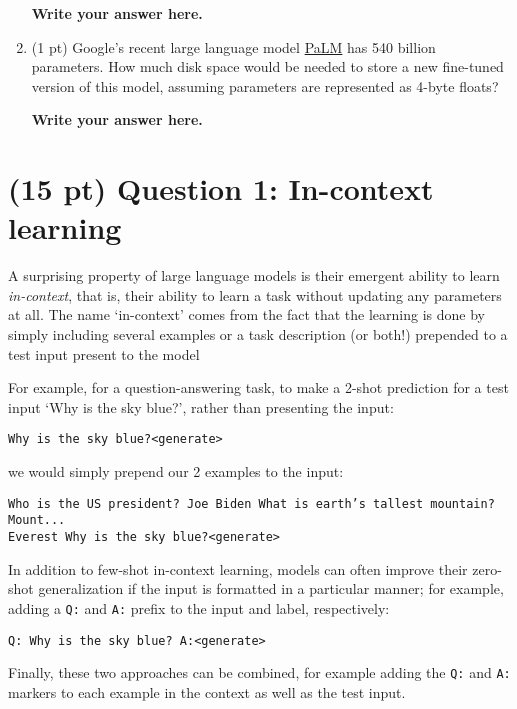 \documentclass[12pt]{article}
\begin{document}
\begin{enumerate}
    \textbf{\color{red} Write your answer here.}

    \item (1 pt) Google's recent large language model \href{https://storage.googleapis.com/pathways-language-model/PaLM-paper.pdf}{PaLM} has 540 billion parameters. How much disk space would be needed to store a new fine-tuned version of this model, assuming parameters are represented as 4-byte floats?

    \textbf{\color{red} Write your answer here.}

\end{enumerate}

\section*{(15 pt) Question 1: In-context learning}
A surprising property of large language models is their emergent ability to learn \textit{in-context}, that is, their ability to learn a task without updating any parameters at all. The name `in-context' comes from the fact that the learning is done by simply including several examples or a task description (or both!) prepended to a test input present to the model

For example, for a question-answering task, to make a 2-shot prediction for a test input `Why is the sky blue?', rather than presenting the input:

\texttt{Why is the sky blue?\textless generate\textgreater}

we would simply prepend our 2 examples to the input:

\texttt{Who is the US president? Joe Biden What is earth's tallest mountain? Mount... \\
Everest Why is the sky blue?\textless generate\textgreater}

In addition to few-shot in-context learning, models can often improve their zero-shot generalization if the input is formatted in a particular manner; for example, adding a \texttt{Q:} and \texttt{A:} prefix to the input and label, respectively:

\texttt{Q: Why is the sky blue? A:\textless generate\textgreater}

Finally, these two approaches can be combined, for example adding the \texttt{Q:} and \texttt{A:} markers to each example in the context as well as the test input.
\end{document}
